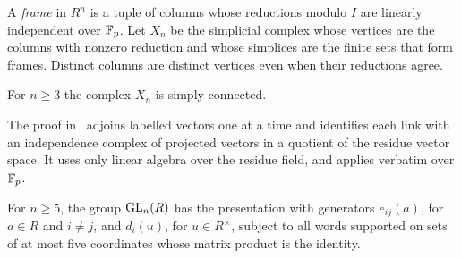 A \emph{frame} in $R^n$ is a tuple of columns whose reductions modulo $I$ are linearly independent over $\mathbb F_p$. Let
$X_n$ be the simplicial complex whose vertices are the columns with nonzero reduction and whose simplices are the finite
sets that form frames. Distinct columns are distinct vertices even when their reductions agree.

\begin{lemma}\label{lem:st-frames-sc}
For $n\geq3$ the complex $X_n$ is simply connected.
\end{lemma}

The proof in~\cite{OAI247periodic} adjoins labelled vectors one at a time and identifies each link with an independence
complex of projected vectors in a quotient of the residue vector space. It uses only linear algebra over the residue
field, and applies verbatim over $\mathbb F_p$.

\begin{proposition}\label{prop:small-GL}
For $n\geq5$, the group $\operatorname{GL}_n(R)$ has the presentation with generators $e_{ij}(a)$, for $a\in R$ and $i\neq j$, and
$d_i(u)$, for $u\in R^\times$, subject to all words supported on sets of at most five coordinates whose matrix product
is the identity.
\end{proposition}

